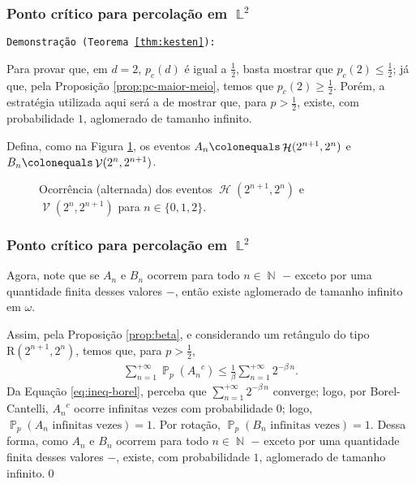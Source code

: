 \documentclass[9pt]{beamer}
\theoremstyle{definition} %
\DeclareMathOperator{\PX}{\mathbb{P}} %
\DeclareMathOperator{\NX}{\mathbb{N}} %
\DeclareMathOperator{\LX}{\mathbb{L}} %
\DeclareMathOperator{\HL}{\mathcal{H}} %
\DeclareMathOperator{\VL}{\mathcal{V}} %
\begin{document}
	\begin{frame}[t]
		\frametitle{Ponto crítico para percolação em $\LX^2$}
		\texttt{Demonstração (Teorema \ref{thm:kesten}):}
			
		Para provar que, em $d = 2$, $p_c(d)$ é igual a $\frac{1}{2}$, basta mostrar que $p_c(2) \leq \frac{1}{2}$; já que, pela Proposição \ref{prop:pc-maior-meio}, temos que $p_c(2) \geq \frac{1}{2}$. Porém, a estratégia utilizada aqui será a de mostrar que, para $p > \frac{1}{2}$, existe, com probabilidade $1$, aglomerado de tamanho infinito.\pause
		
		Defina, como na Figura \ref{fig:caixas-iteradas}, os eventos $A_n \colonequals \HL(2^{n+1}, 2^n)$ e $B_n \colonequals \VL(2^n, 2^{n+1})$.
		
		\begin{figure}
			
			\vspace{-9pt}
			\caption{\justifying Ocorrência (alternada) dos eventos $\HL(2^{n+1}, 2^n)$ e $\VL(2^n, 2^{n+1})$ para $n \in \{0, 1, 2\}$.}
			\label{fig:caixas-iteradas}
		\end{figure}
	\end{frame}

	\begin{frame}[t]
	\frametitle{Ponto crítico para percolação em $\LX^2$}
		Agora, note que se $A_n$ e $B_n$ ocorrem para todo $n \in \NX$ $-$ exceto por uma quantidade finita desses valores $-$, então existe aglomerado de tamanho infinito em $\omega$.
		
		Assim, pela Proposição \ref{prop:beta}, e considerando um retângulo do tipo $\text{R}(2^{n+1}, 2^n)$, temos que, para $p > \frac{1}{2}$,
		\begin{align}\label{eq:ineq-borel}
		\sum_{n = 1}^{+\infty}\PX_p({A_n}^c) \leq \frac{1}{\beta} \sum_{n = 1}^{+\infty} 2^{-\beta\,n}.
		\end{align}\pause	
		Da Equação \ref{eq:ineq-borel}, perceba que $\sum_{n=1}^{+\infty}2^{-\beta\,n}$ converge; logo, por Borel-Cantelli, ${A_n}^c$ ocorre infinitas vezes com probabilidade $0$; logo, $\PX_p(A_n \text{ infinitas vezes}) = 1$. Por rotação, $\PX_p(B_n \text{ infinitas vezes}) = 1$. Dessa forma, como $A_n$ e $B_n$ ocorrem para todo $n \in \NX$ $-$ exceto por uma quantidade finita desses valores $-$, existe, com probabilidade $1$, aglomerado de tamanho infinito.\hspace{\fill}\qed
	\end{frame}
\end{document}
